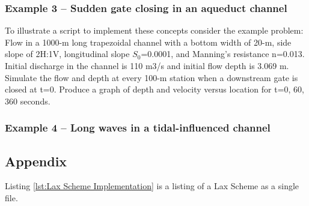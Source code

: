 \subsubsection{Example 3 -- Sudden gate closing in an aqueduct channel}
To illustrate a script to implement these concepts consider the example problem:\\
Flow in a 1000-m long trapezoidal channel with a bottom width of 20-m, side slope of 2H:1V, longitudinal slope $S_0$=0.0001, and Manning's resistance n=0.013. 
Initial discharge in the channel is 110 m3/s and initial flow depth is 3.069 m.
Simulate the flow and depth at every 100-m station when a downstream gate is closed at t=0. 
Produce a graph of depth and velocity versus location for t=0, 60, 360 seconds.

\subsubsection{Example 4 -- Long waves in a tidal-influenced channel}


\subsection{Appendix}
Listing \ref{lst:Lax Scheme Implementation} is a listing of a Lax Scheme as a single file.

